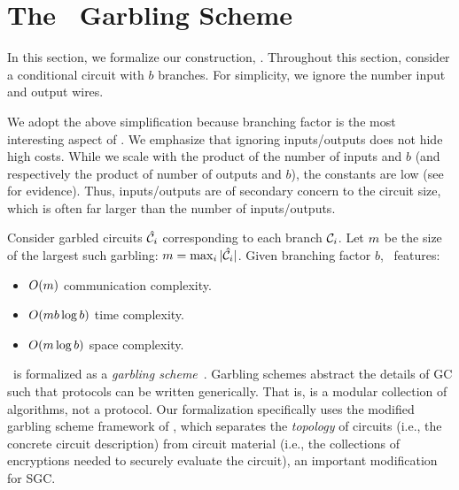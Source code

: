 \section{The \ourschemelong\ Garbling Scheme}\label{sec:approach}
In this section, we formalize our construction, \ourschemelong.
Throughout this section, consider a conditional circuit with $b$
branches.
For simplicity, we ignore the number input and output wires.

We adopt the above simplification because branching factor is the most interesting
aspect of \ourschemelong. We emphasize that ignoring inputs/outputs
does not hide high costs.
While we scale with the product of the number of inputs and $b$ (and
respectively the product of number of outputs and $b$), the
constants are low (see  for evidence).
Thus, inputs/outputs are of secondary concern to the circuit size,
which is often far larger than the number of inputs/outputs.

Consider garbled circuits $\hat{\mathcal C}_i$ corresponding to each branch
$\mathcal C_i$. Let $m$ be the size of the largest such garbling: $m
= \max_i |\hat{\mathcal C}_i|$.
Given branching factor $b$, \ourschemelong\ features:
\begin{itemize}
  \item $O(m)$ communication complexity.
  \item $O(m b \log b)$ time complexity.
  \item $O(m \log b)$ space complexity.
\end{itemize}


\ourschemelong\ is formalized as a \emph{garbling
scheme}~\cite{CCS:BelHoaRog12}.
Garbling schemes abstract the details of GC such that protocols can be written generically.
That is, \ourschemelong is a modular collection of algorithms, not a
protocol.
Our formalization specifically uses the modified garbling scheme
framework of \HK, which separates the \emph{topology} of circuits
(i.e., the concrete circuit description) from circuit material
(i.e., the collections of encryptions needed to securely evaluate the
circuit), an important modification for SGC.

